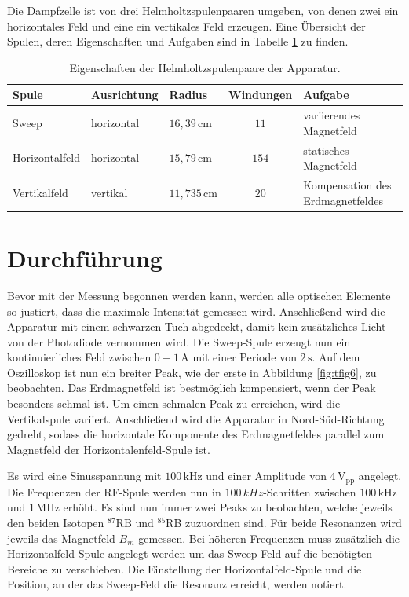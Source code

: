 Die Dampfzelle ist von drei Helmholtzspulenpaaren umgeben, von denen zwei ein horizontales Feld und eine ein vertikales Feld erzeugen.
Eine Übersicht der Spulen, deren Eigenschaften und Aufgaben sind in Tabelle \ref{tab:ttab1} zu finden.
\FloatBarrier
\begin{table}[h]
    \centering
    \caption{Eigenschaften der Helmholtzspulenpaare der Apparatur.}
    \label{tab:ttab1}
    \begin{tabular}{l l l c l}
        \toprule
        {Spule} & {Ausrichtung} & {Radius} & {Windungen} & {Aufgabe} \\
        \midrule
        Sweep & horizontal & $16,39\,\si{\cm}$ & $11$ & variierendes Magnetfeld\\
        Horizontalfeld & horizontal & $15,79\,\si{\cm}$ & $154$ & statisches Magnetfeld\\
        Vertikalfeld & vertikal & $11,735\,\si{\cm}$ & $20$ & Kompensation des Erdmagnetfeldes\\
        \bottomrule
    \end{tabular}
\end{table}
\FloatBarrier
\noindent

\section{Durchführung}
Bevor mit der Messung begonnen werden kann, werden alle optischen Elemente so justiert, dass die maximale Intensität gemessen wird.
Anschließend wird die Apparatur mit einem schwarzen Tuch abgedeckt, damit kein zusätzliches Licht von der Photodiode vernommen wird.
Die Sweep-Spule erzeugt nun ein kontinuierliches Feld zwischen $0-1\,\si{\A}$ mit einer Periode von $2\,\si{\s}$.
Auf dem Oszilloskop ist nun ein breiter Peak, wie der erste in Abbildung \ref{fig:tfig6}, zu beobachten.
Das Erdmagnetfeld ist bestmöglich kompensiert, wenn der Peak besonders schmal ist.
Um einen schmalen Peak zu erreichen, wird die Vertikalspule variiert.
Anschließend wird die Apparatur in Nord-Süd-Richtung gedreht, sodass die horizontale Komponente des Erdmagnetfeldes parallel zum Magnetfeld der Horizontalenfeld-Spule ist.

Es wird eine Sinusspannung mit $100\,\si{\kHz}$ und einer Amplitude von $4\,\text{V}_{\text{pp}}$ angelegt.
Die Frequenzen der RF-Spule werden nun in $100\,\si{kHz}$-Schritten zwischen $100\,\si{\kHz}$ und $1\,\si{\MHz}$ erhöht.
Es sind nun immer zwei Peaks zu beobachten, welche jeweils den beiden Isotopen $^{87}$RB und $^{85}$RB zuzuordnen sind.
Für beide Resonanzen wird jeweils das Magnetfeld $B_m$ gemessen.
Bei höheren Frequenzen muss zusätzlich die Horizontalfeld-Spule angelegt werden um das Sweep-Feld auf die benötigten Bereiche zu verschieben.
Die Einstellung der Horizontalfeld-Spule und die Position, an der das Sweep-Feld die Resonanz erreicht, werden notiert.

